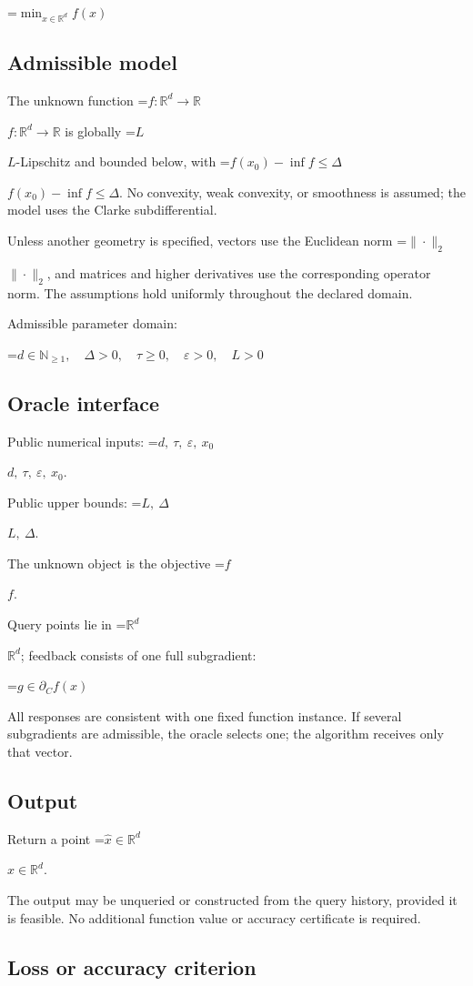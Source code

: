 \documentclass[10pt,a4paper]{article}
\newcommand{\AtlasMath}[1]{\par\begingroup\centering\setbox0=\hbox{$\displaystyle #1$}\ifdim\wd0>1.4\linewidth\typeout{ATLAS WIDE FORMULA: \the\wd0}\fi\ifdim\wd0>\linewidth\resizebox{\linewidth}{!}{\box0}\else\box0\fi\par\endgroup}
\newcommand{\AtlasInlineMath}[1]{\begingroup\setbox0=\hbox{$#1$}\ifdim\wd0>.4\linewidth\endgroup\AtlasMath{#1}\else\endgroup$#1$\fi}
\begin{document}
\AtlasMath{\min_{x\in \mathbb{R}^d}f(x)}


\subsection{Admissible model}
The unknown function \AtlasInlineMath{f:\mathbb R^d\to\mathbb R} is globally \AtlasInlineMath{L}-Lipschitz and bounded below, with \AtlasInlineMath{f(x_0)-\inf f\le\Delta}. No convexity, weak convexity, or smoothness is assumed; the model uses the Clarke subdifferential.

Unless another geometry is specified, vectors use the Euclidean norm \AtlasInlineMath{\|\cdot\|_2}, and matrices and higher derivatives use the corresponding operator norm. The assumptions hold uniformly throughout the declared domain.

Admissible parameter domain:


\AtlasMath{d\in\mathbb{N}_{\ge1},\quad \Delta>0,\quad \tau\ge0,\quad \varepsilon>0,\quad L>0}


\subsection{Oracle interface}
Public numerical inputs: \AtlasInlineMath{d,\ \tau,\ \varepsilon,\ x_0}.

Public upper bounds: \AtlasInlineMath{L,\ \Delta}.

The unknown object is the objective \AtlasInlineMath{f}.

Query points lie in \AtlasInlineMath{\mathbb{R}^d}; feedback consists of one full subgradient:


\AtlasMath{g\in\partial_C f(x)}


All responses are consistent with one fixed function instance. If several subgradients are admissible, the oracle selects one; the algorithm receives only that vector.

\subsection{Output}
Return a point \AtlasInlineMath{\widehat x\in\mathbb R^d}.

The output may be unqueried or constructed from the query history, provided it is feasible. No additional function value or accuracy certificate is required.

\subsection{Loss or accuracy criterion}
\end{document}
